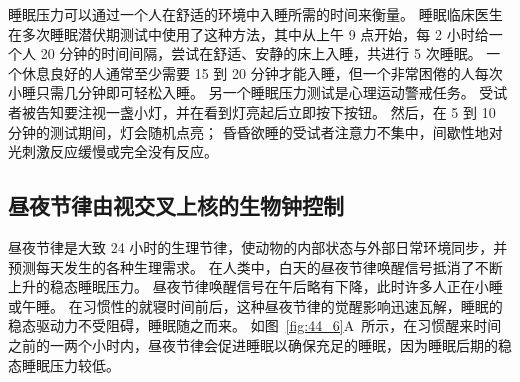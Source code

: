 睡眠压力可以通过一个人在舒适的环境中入睡所需的时间来衡量。
睡眠临床医生在多次睡眠潜伏期测试中使用了这种方法，其中从上午 9 点开始，每 2 小时给一个人 20 分钟的时间间隔，尝试在舒适、安静的床上入睡，共进行 5 次睡眠。
一个休息良好的人通常至少需要 15 到 20 分钟才能入睡，但一个非常困倦的人每次小睡只需几分钟即可轻松入睡。
另一个睡眠压力测试是心理运动警戒任务。
受试者被告知要注视一盏小灯，并在看到灯亮起后立即按下按钮。
然后，在 5 到 10 分钟的测试期间，灯会随机点亮；
昏昏欲睡的受试者注意力不集中，间歇性地对光刺激反应缓慢或完全没有反应。



\subsection{昼夜节律由视交叉上核的生物钟控制}

昼夜节律是大致 24 小时的生理节律，使动物的内部状态与外部日常环境同步，并预测每天发生的各种生理需求。
在人类中，白天的昼夜节律唤醒信号抵消了不断上升的稳态睡眠压力。
昼夜节律唤醒信号在午后略有下降，此时许多人正在小睡或午睡。
在习惯性的就寝时间前后，这种昼夜节律的觉醒影响迅速瓦解，睡眠的稳态驱动力不受阻碍，睡眠随之而来。
如图~\ref{fig:44_6}A~所示，在习惯醒来时间之前的一两个小时内，昼夜节律会促进睡眠以确保充足的睡眠，因为睡眠后期的稳态睡眠压力较低。


